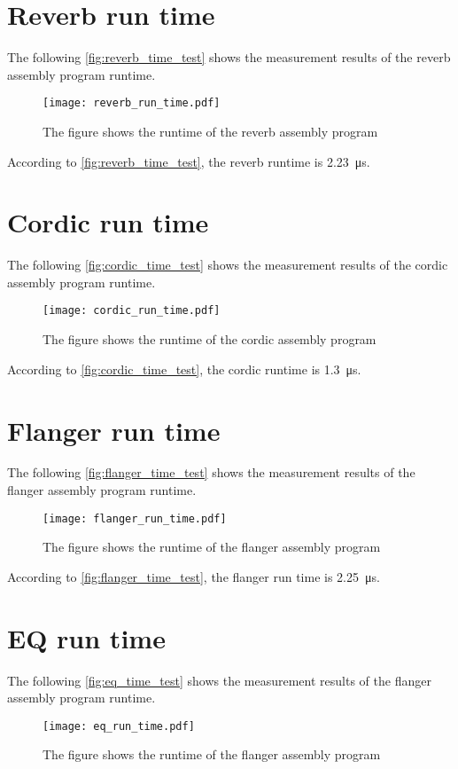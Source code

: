 \section*{Reverb run time}
The following \autoref{fig:reverb_time_test} shows the measurement results of the \gls{reverb} assembly program runtime.
\begin{figure}[htbp!]
	\centering
		\texttt{[image: reverb\_run\_time.pdf]}
		\caption{The figure shows the runtime of the \gls{reverb} assembly program}
		\label{fig:reverb_time_test}
\end{figure}

According to \autoref{fig:reverb_time_test}, the \gls{reverb} runtime is \SI{2.23}{\micro\second}.

\section*{Cordic run time}
The following \autoref{fig:cordic_time_test} shows the measurement results of the cordic assembly program runtime.
\begin{figure}[htbp!]
	\centering
		\texttt{[image: cordic\_run\_time.pdf]}
		\caption{The figure shows the runtime of the cordic assembly program}
		\label{fig:cordic_time_test}
\end{figure}

According to \autoref{fig:cordic_time_test}, the cordic runtime is \SI{1.3}{\micro\second}.

\section*{Flanger run time}
The following \autoref{fig:flanger_time_test} shows the measurement results of the flanger assembly program runtime.
\begin{figure}[htbp!]
	\centering
		\texttt{[image: flanger\_run\_time.pdf]}
		\caption{The figure shows the runtime of the flanger assembly program}
		\label{fig:flanger_time_test}
\end{figure}

According to \autoref{fig:flanger_time_test}, the flanger run time is \SI{2.25}{\micro\second}.

\section*{EQ run time}
The following \autoref{fig:eq_time_test} shows the measurement results of the flanger assembly program runtime.
\begin{figure}[htbp!]
	\centering
		\texttt{[image: eq\_run\_time.pdf]}
		\caption{The figure shows the runtime of the flanger assembly program}
		\label{fig:eq_time_test}
\end{figure}

